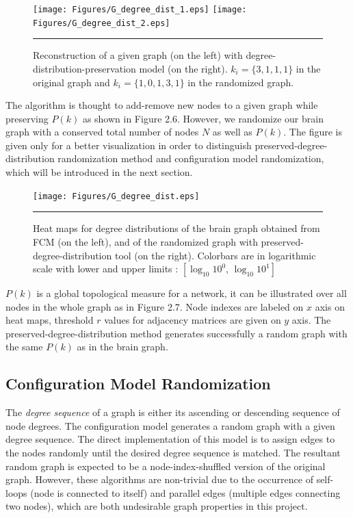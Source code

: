 \begin{figure}[htbp]
  \centering
	\texttt{[image: Figures/G\_degree\_dist\_1.eps]}  
	\texttt{[image: Figures/G\_degree\_dist\_2.eps]}    
    \rule{35em}{0.5pt}
  \caption[Degree Distribution 2D Example]{Reconstruction of a given graph (on the left) with degree-distribution-preservation model (on the right). $k_i=\{3,1,1,1\}$ in the original graph and $k_{i}=\{1,0,1,3,1\}$ in the randomized graph. }
  \label{fig:Degree Distribution Example}
\end{figure}

The algorithm is thought to add-remove new nodes to a given graph while preserving $P(k)$ as shown in Figure 2.6. However, we randomize our brain graph with a conserved total number of nodes $N$ as well as $P(k)$. The figure is given only for a better visualization in order to distinguish preserved-degree-distribution randomization method and configuration model randomization, which will be introduced in the next section.

\begin{figure}[htbp]
  \centering
	\texttt{[image: Figures/G\_degree\_dist.eps]}  
    \rule{35em}{0.5pt}
  \caption[Degree Distribution 3D Example]{Heat maps for degree distributions of the brain graph obtained from FCM (on the left), and of the randomized graph with preserved-degree-distribution tool (on the right). Colorbars are in logarithmic scale with lower and upper limits : $[\log_{10} {10}^0 , \,  \log_{10} {10}^1]$}
  \label{fig:Degree Distribution 3D Example}
\end{figure}

$P(k)$ is a global topological measure for a network, it can be illustrated over all nodes in the whole graph as in Figure 2.7. Node indexes are labeled on $x$ axis on heat maps, threshold $r$ values for adjacency matrices are given on $y$ axis. The preserved-degree-distribution method generates successfully a random graph with the same $P(k)$ as in the brain graph. 


\subsection{Configuration Model Randomization}

The \textit{degree sequence} of a graph is either its ascending or descending sequence of node degrees. The configuration model generates a random graph with a given degree sequence. The direct implementation of this model is to assign edges to the nodes randomly until the desired degree sequence is matched. The resultant random graph is expected to be a node-index-shuffled version of the original graph. However, these algorithms are non-trivial due to the occurrence of self-loops (node is connected to itself) and parallel edges (multiple edges connecting two nodes), which are both undesirable graph properties in this project. 

